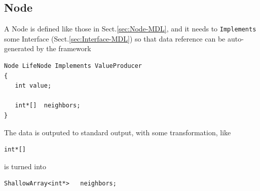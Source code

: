 \subsection{Node}
\label{sec:Node-MDL-2-C++-code-generated}
\label{sec:generateInstance-CompCategoryBase-MDL}

A Node is defined like those in Sect.\ref{sec:Node-MDL}, and it needs to \verb!Implements! some Interface (Sect.\ref{sec:Interface-MDL}) 
so that data reference can be auto-generated by the framework

\begin{verbatim}
Node LifeNode Implements ValueProducer
{
   int value;
   
   int*[]  neighbors;
}
\end{verbatim}

The data is outputed to standard output, with some transformation, like 
\begin{verbatim}
int*[]
\end{verbatim}
is turned into
\begin{verbatim}
ShallowArray<int*>   neighbors;
\end{verbatim}

